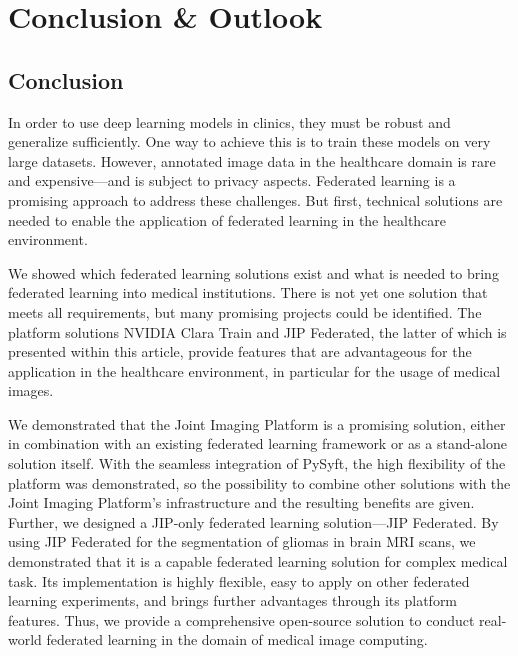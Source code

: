 \section{Conclusion \& Outlook}
\label{sec:ConclusionOutlook}

\subsection{Conclusion}
\label{subsec:Conclusion}
In order to use deep learning models in clinics, they must be robust and generalize sufficiently. One way to achieve this is to train these models on very large datasets. However, annotated image data in the healthcare domain is rare and expensive---and is subject to privacy aspects.
Federated learning is a promising approach to address these challenges. But first, technical solutions are needed to enable the application of federated learning in the healthcare environment.


We showed which federated learning solutions exist and what is needed to bring federated learning into medical institutions. There is not yet one solution that meets all requirements, but many promising projects could be identified.
The platform solutions NVIDIA Clara Train and JIP Federated, the latter of which is presented within this article, provide features that are advantageous for the application in the healthcare environment, in particular for the usage of medical images.

We demonstrated that the Joint Imaging Platform is a promising solution, either in combination with an existing federated learning framework or as a stand-alone solution itself.
With the seamless integration of PySyft, the high flexibility of the platform was demonstrated, so the possibility to combine other solutions with the Joint Imaging Platform's infrastructure and the resulting benefits are given.
Further, we designed a JIP-only federated learning solution---JIP Federated.
By using JIP Federated for the segmentation of gliomas in brain MRI scans, we demonstrated that it is a capable federated learning solution for complex medical task. Its implementation is highly flexible, easy to apply on other federated learning experiments, and brings further advantages through its platform features.
Thus, we provide a comprehensive open-source solution to conduct real-world federated learning in the domain of medical image computing.

